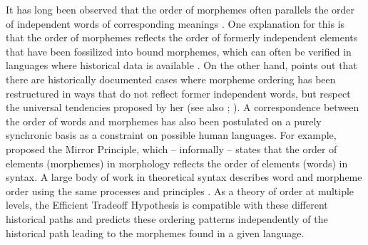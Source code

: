 \documentclass[11pt,letterpaper]{article}
\newcommand{\citep}{\parencite}
\newcommand{\citet}{\Textcite}
\begin{document}


It has long been observed that the order of morphemes often parallels the order of independent words of corresponding meanings \citep{givon1971historical,venneman1973explanation,baker1985the}.
One explanation for this is that the order of morphemes reflects the order of formerly independent elements that have been fossilized into bound morphemes, which can often be verified in languages where historical data is available \citet{givon1971historical,venneman1973explanation}.
On the other hand, \citet{bybee-morphology-1985} points out that there are historically documented cases where morpheme ordering has been restructured in ways that do not reflect former independent words, but respect the universal tendencies proposed by her (see also \citet{mithun2000the, haspelmath1993the, mithun1995affixation}; \citet[Section 15]{rice2000morpheme}).
A correspondence between the order of words and morphemes has also been postulated on a purely synchronic basis as a constraint on possible human languages.
For example, \cite{baker1985the} proposed the Mirror Principle, which -- informally -- states that the order of elements (morphemes) in morphology reflects the order of elements (words) in syntax.
A large body of work in theoretical syntax describes word and morpheme order using the same processes and principles \citep{halle1993distributed}.
As a theory of order at multiple levels, the Efficient Tradeoff Hypothesis is compatible with these different historical paths and predicts these ordering patterns independently of the historical path leading to the morphemes found in a given language.



\end{document}

